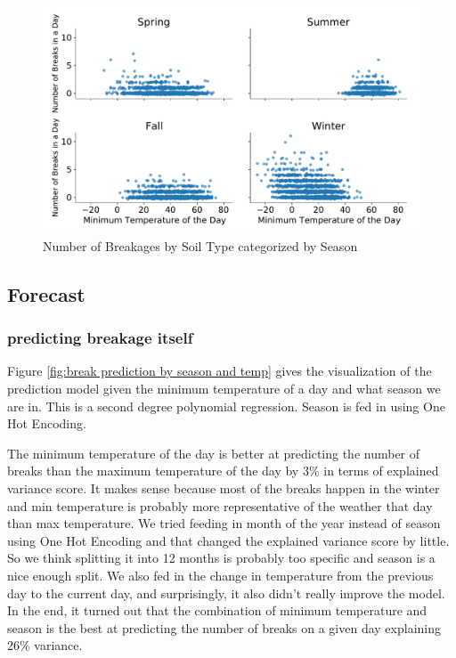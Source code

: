 \documentclass[twocolumn]{article}
\begin{document}
\begin{figure}
    \includegraphics[width = \columnwidth]{Wen/break pattern by season.pdf}
    \caption{Number of Breakages by Soil Type categorized by Season}
    \label{fig:Break Pattern by Seaon}
\end{figure}


\subsection{Forecast}
\subsubsection{predicting breakage itself}


Figure \ref{fig:break prediction by season and temp} gives the visualization of the prediction model given the minimum temperature of a day and what season we are in. This is a second degree polynomial regression. Season is fed in using One Hot Encoding.

The minimum temperature of the day is better at predicting the number of breaks than the maximum temperature of the day by 3\% in terms of explained variance score. It makes sense because most of the breaks happen in the winter and min temperature is probably more representative of the weather that day than max temperature. We tried feeding in month of the year instead of season using One Hot Encoding and that changed the explained variance score by little. So we think splitting it into 12 months is probably too specific and season is a nice enough split. We also fed in the change in temperature from the previous day to the current day, and surprisingly, it also didn't really improve the model. In the end, it turned out that the combination of minimum temperature and season is the best at predicting the number of breaks on a given day explaining 26\% variance.
\end{document}
